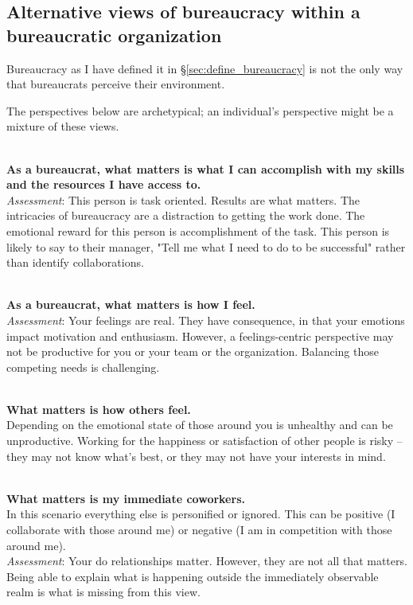 \subsection{Alternative views of bureaucracy within a bureaucratic organization\label{sec:alternative_views_from_within}}

Bureaucracy as I have defined it in \S\ref{sec:define_bureaucracy} is not the only way that bureaucrats perceive their environment. 

The perspectives below are archetypical; an individual's perspective might be a mixture of these views.

\ \\

\textbf{As a bureaucrat, what matters is what I can accomplish with my skills and the resources I have access to.} \\
\textit{Assessment}: This person is task oriented. Results are what matters. The intricacies of bureaucracy are a distraction to getting the work done. The emotional reward for this person is accomplishment of the task. This person is likely to say to their manager, "Tell me what I need to do to be successful" rather than identify collaborations.

\ \\

\textbf{As a bureaucrat, what matters is how I feel.} \\
\textit{Assessment}: Your feelings are real. They have consequence, in that your emotions impact motivation and enthusiasm. However, a feelings-centric perspective may not be productive for you or your team or the organization. Balancing those competing needs is challenging.

\ \\ 

\textbf{What matters is how others feel.}\\
Depending on the emotional state of those around you is unhealthy and can be unproductive. Working for the happiness or satisfaction of other people is risky -- they may not know what's best, or they may not have your interests in mind.

\ \\

\textbf{What matters is my immediate coworkers.}\\
In this scenario everything else is personified or ignored. This can be positive (I collaborate with those around me) or negative (I am in competition with those around me). \\
\textit{Assessment}: Your do relationships matter. However, they are not all that matters. Being able to explain what is happening outside the immediately observable realm is what is missing from this view. 

